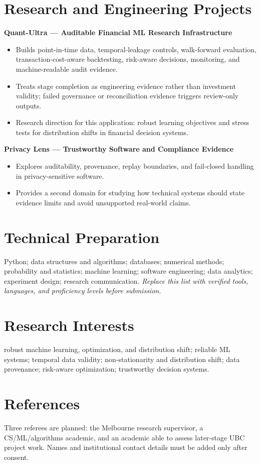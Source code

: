 \documentclass[11pt]{article}
\begin{document}
\section*{Research and Engineering Projects}
\textbf{Quant-Ultra --- Auditable Financial ML Research Infrastructure}
\begin{itemize}
\item Builds point-in-time data, temporal-leakage controls, walk-forward evaluation, transaction-cost-aware backtesting, risk-aware decisions, monitoring, and machine-readable audit evidence.
\item Treats stage completion as engineering evidence rather than investment validity; failed governance or reconciliation evidence triggers review-only outputs.
\item Research direction for this application: robust learning objectives and stress tests for distribution shifts in financial decision systems.
\end{itemize}

\begin{samepage}
\textbf{Privacy Lens --- Trustworthy Software and Compliance Evidence}
\begin{itemize}
\item Explores auditability, provenance, replay boundaries, and fail-closed handling in privacy-sensitive software.
\item Provides a second domain for studying how technical systems should state evidence limits and avoid unsupported real-world claims.
\end{itemize}
\end{samepage}

\section*{Technical Preparation}
Python; data structures and algorithms; databases; numerical methods; probability and statistics; machine learning; software engineering; data analytics; experiment design; research communication. \textit{Replace this list with verified tools, languages, and proficiency levels before submission.}

\section*{Research Interests}
robust machine learning, optimization, and distribution shift; reliable ML systems; temporal data validity; non-stationarity and distribution shift; data provenance; risk-aware optimization; trustworthy decision systems.

\section*{References}
Three referees are planned: the Melbourne research supervisor, a CS/ML/algorithms academic, and an academic able to assess later-stage UBC project work. Names and institutional contact details must be added only after consent.
\end{document}
